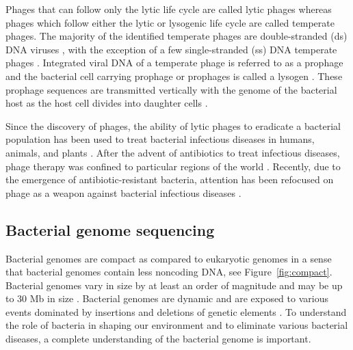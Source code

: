  Phages that can follow only the lytic life cycle are called lytic phages whereas phages which follow either the lytic or lysogenic life cycle are called temperate phages. The majority of the identified temperate phages are double-stranded (ds) DNA viruses \citep{szekely_single-stranded_2016}, with the exception of a few single-stranded (ss) DNA temperate phages  \citep{krupovic_single-stranded_2015}. Integrated viral DNA of a temperate phage is referred to as a prophage and the bacterial cell carrying prophage or prophages is called a lysogen \citep{lwoff_lysogeny_1953}.  These prophage sequences are transmitted vertically with the genome of the bacterial host as the host cell divides into daughter cells \cite{feiner_new_2015}. 

 
 Since the discovery of phages, the ability of lytic phages to eradicate a bacterial population has been used to treat bacterial infectious diseases in humans, animals, and plants \citep{abedon_editorial:_2017,myelnikov_alternative_2018}.  After the advent of antibiotics to treat infectious diseases, phage therapy was confined to particular regions of the world \citep{myelnikov_alternative_2018}. Recently, due to the emergence of antibiotic-resistant bacteria, attention has been refocused on phage as a weapon against bacterial infectious diseases \citep{abedon_editorial:_2017, bull_dynamics_2002}. 
 
 \subsection{Bacterial genome sequencing}
Bacterial genomes are compact as compared to eukaryotic genomes in a sense that bacterial genomes contain less noncoding DNA, see Figure~\ref{fig:compact}.
Bacterial genomes vary in size by at least an order of magnitude \citep {bobay_evolution_2017} and may be up to 30 Mb in size \citep{brown_genomes_2007}. Bacterial genomes are dynamic and are exposed to various events dominated by insertions and deletions of genetic elements \citep{sela_theory_2016}. To understand the role of bacteria in shaping our environment and to eliminate various bacterial diseases, a complete understanding of the bacterial genome is important. 

